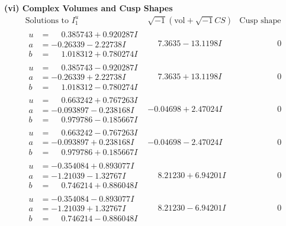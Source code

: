 \documentclass[1p]{elsarticle_modified}
\theoremstyle{definition}
\newcommand{\I}{\sqrt{-1}}
\begin{document}
\newpage\flushleft \textbf{(vi) Complex Volumes and Cusp Shapes}
$$\begin{array}{c|c|c}  
\text{Solutions to }I^u_{1}& \I (\text{vol} + \sqrt{-1}CS) & \text{Cusp shape}\\
 \hline 
\begin{aligned}
u &= \phantom{-}0.385743 + 0.920287 I \\
a &= -0.26339 - 2.22738 I \\
b &= \phantom{-}1.018312 + 0.780274 I\end{aligned}
 & \phantom{-}7.3635 - 13.1198 I & \phantom{-0.000000 } 0 \\ \hline\begin{aligned}
u &= \phantom{-}0.385743 - 0.920287 I \\
a &= -0.26339 + 2.22738 I \\
b &= \phantom{-}1.018312 - 0.780274 I\end{aligned}
 & \phantom{-}7.3635 + 13.1198 I & \phantom{-0.000000 } 0 \\ \hline\begin{aligned}
u &= \phantom{-}0.663242 + 0.767263 I \\
a &= -0.093897 - 0.238168 I \\
b &= \phantom{-}0.979786 - 0.185667 I\end{aligned}
 & -0.04698 + 2.47024 I & \phantom{-0.000000 } 0 \\ \hline\begin{aligned}
u &= \phantom{-}0.663242 - 0.767263 I \\
a &= -0.093897 + 0.238168 I \\
b &= \phantom{-}0.979786 + 0.185667 I\end{aligned}
 & -0.04698 - 2.47024 I & \phantom{-0.000000 } 0 \\ \hline\begin{aligned}
u &= -0.354084 + 0.893077 I \\
a &= -1.21039 - 1.32767 I \\
b &= \phantom{-}0.746214 + 0.886048 I\end{aligned}
 & \phantom{-}8.21230 + 6.94201 I & \phantom{-0.000000 } 0 \\ \hline\begin{aligned}
u &= -0.354084 - 0.893077 I \\
a &= -1.21039 + 1.32767 I \\
b &= \phantom{-}0.746214 - 0.886048 I\end{aligned}
 & \phantom{-}8.21230 - 6.94201 I & \phantom{-0.000000 } 0 \\ \hline\begin{aligned}

\end{aligned}
\end{array}$$
\end{document}
